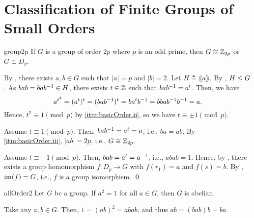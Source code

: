 \documentclass[../modern_algebra.tex]{subfiles}
\begin{document}
\section{Classification of Finite Groups of Small Orders}

\begin{Theorem}{\textsf{}}{group2p}
    If \(G\) is a group of order \(2p\) where \(p\) is an odd prime,
    then \(G \cong \ZZ_{2p}\) or \(G \cong D_p\).
\end{Theorem}
\begin{myclaim}[Proof]
    By ,
    there exists \(a, b \in G\) such that \(|a| = p\) and \(|b| = 2\).
    Let \(H \triangleq \lang a \rang\).
    By , \(H \trianglelefteq G\).
    As \(bab = bab^{-1} \in H\), there exists \(t \in \ZZ\) such that \(bab^{-1} = a^t\).
    Then, we have
    \[
        a^{t^2} = (a^t)^t = (bab^{-1})^t = ba^t b^{-1} = b b a b^{-1} b^{-1} = a.
    \]
    Hence, \(t^2 \equiv 1 \pmod{p}\) by \ref{itm:basicOrder.ii},
    so we have \(t \equiv \pm 1 \pmod{p}\).
    \begin{itemize}[nolistsep, leftmargin=*, listparindent=\parindent]
        \ii
        Assume \(t \equiv 1 \pmod{p}\).
        Then, \(bab^{-1} = a^t = a\), i.e., \(ba = ab\).
        By \ref{itm:basicOrder.iii}, \(|ab| = 2p\), i.e., \(G \cong \ZZ_{2p}\).

        \ii
        Assume \(t \equiv -1 \pmod{p}\).
        Then, \(bab = a^t = a^{-1}\), i.e., \(abab = 1\).
        Hence, by ,
        there exists a group homomorphism \(f \colon D_p \to G\)
        with \(f(r_1) = a\) and \(f(s) = b\).
        By , \(\operatorname{im}(f) = G\), i.e., \(f\)
        is a group isomorphism. \qed
    \end{itemize}
\end{myclaim}

\begin{Lemma}{\textsf{}}{allOrder2}
    Let \(G\) be a group. If \(a^2 = 1\) for all \(a \in G\),
    then \(G\) is abelian.
\end{Lemma}
\begin{myproof}[Proof]
    Take any \(a, b \in G\).
    Then, \(1 = (ab)^2 = abab\), and thus \(ab = (bab)b = ba\).
\end{myproof}
\end{document}
